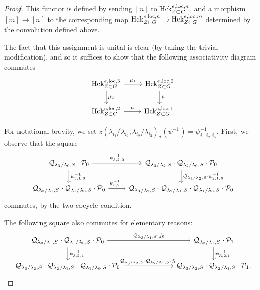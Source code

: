 \begin{proof}
This functor is defined by sending $[n]$ to $\mathrm{Hck}^{e,\mathrm{loc},n}_{Z \subset G}$, and a morphism $[m] \to [n]$ to the corresponding map $\mathrm{Hck}_{Z \subset G}^{e,\mathrm{loc},n} \to \mathrm{Hck}_{Z \subset G}^{e,\mathrm{loc},m}$ determined by the convolution defined above. 

The fact that this assignment is unital is clear (by taking the trivial modification), and so it suffices to show that the following associativity diagram commutes
\[
\begin{tikzcd}
    \Hck^{e,\loc,3}_{Z \subset G} \arrow["\mu_{2}"]{d} \arrow["\mu_{1}"]{r} & \Hck^{e,\loc,2}_{Z \subset G} \arrow["\mu"]{d} \\
    \Hck^{e,\loc,2}_{Z \subset G} \arrow["\mu"]{r} & \Hck^{e,\loc,1}_{Z \subset G}.
\end{tikzcd}
\]

For notational brevity, we set $z(\lambda_{i_{1}}/\lambda_{i_{2}},\lambda_{i_{2}}/\lambda_{i_{3}})_{*}(\psi^{-1}) = \psi^{-1}_{i_{1},i_{2},i_{3}}$. First, we observe that the square
\[
\begin{tikzcd}
\Q_{\lambda_{3}/\lambda_{0},S} \cdot \cP_{0} \arrow["\psi^{-1}_{3,2,0}"]{r} \arrow["\psi^{-1}_{3,1,0}"]{d} & \Q_{\lambda_{3}/\lambda_{2},S} \cdot \Q_{\lambda_{2}/\lambda_{0},S} \cdot \cP_{0} \arrow["\Q_{\lambda_{3}/\lambda_{2},S} \cdot \psi^{-1}_{2,1,0}"]{d} \\
\Q_{\lambda_{3}/\lambda_{1},S} \cdot \Q_{\lambda_{1}/\lambda_{0},S} \cdot \cP_{0} \arrow["\psi^{-1}_{3,2,1}"]{r} & \Q_{\lambda_{3}/\lambda_{2},S} \cdot \Q_{\lambda_{2}/\lambda_{1},S} \cdot \Q_{\lambda_{1}/\lambda_{0},S} \cdot \cP_{0}
\end{tikzcd}
\]
commutes, by the two-cocycle condition.

The following square also commutes for elementary reasons:
\[
\begin{tikzcd}[column sep=7em]
    \Q_{\lambda_{3}/\lambda_{1},S} \cdot \Q_{\lambda_{1}/\lambda_{0},S} \cdot \cP_{0} \arrow["\Q_{\lambda_{3}/\lambda_{1},S} \cdot f_{0}"]{r} \arrow["\psi^{-1}_{3,2,1}"]{d} & \Q_{\lambda_{3}/\lambda_{1},S} \cdot \cP_{1} \arrow["\psi^{-1}_{3,2,1}"]{d}\\
    \Q_{\lambda_{3}/\lambda_{2},S} \cdot \Q_{\lambda_{2}/\lambda_{1},S} \cdot \Q_{\lambda_{1}/\lambda_{0},S} \cdot \cP_{0} \arrow["\Q_{\lambda_{3}/\lambda_{2},S} \cdot \Q_{\lambda_{2}/\lambda_{1},S} \cdot f_{0}"]{r} & \Q_{\lambda_{3}/\lambda_{2},S} \cdot \Q_{\lambda_{2}/\lambda_{1},S} \cdot \cP_{1}.
\end{tikzcd}
\]


\end{proof}
